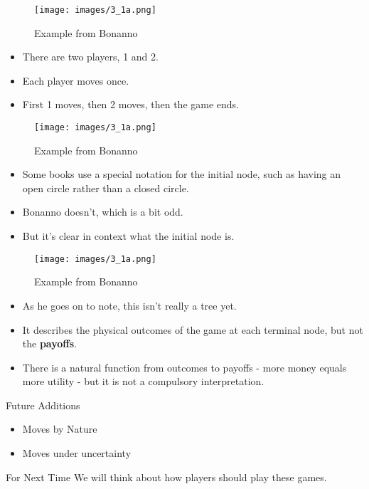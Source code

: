 \documentclass[
  ignorenonframetext,
]{beamer}
\providecommand{\tightlist}{%
  \setlength{\itemsep}{0pt}\setlength{\parskip}{0pt}}
\begin{document}
\begin{frame}
\begin{figure}
\centering
\texttt{[image: images/3\_1a.png]}
\caption{Example from Bonanno}
\end{figure}

\begin{itemize}
\tightlist
\item
  There are two players, 1 and 2.
\item
  Each player moves once.
\item
  First 1 moves, then 2 moves, then the game ends.
\end{itemize}
\end{frame}

\begin{frame}
\begin{figure}
\centering
\texttt{[image: images/3\_1a.png]}
\caption{Example from Bonanno}
\end{figure}

\begin{itemize}
\tightlist
\item
  Some books use a special notation for the initial node, such as having
  an open circle rather than a closed circle.
\item
  Bonanno doesn't, which is a bit odd.
\item
  But it's clear in context what the initial node is.
\end{itemize}
\end{frame}

\begin{frame}
\begin{figure}
\centering
\texttt{[image: images/3\_1a.png]}
\caption{Example from Bonanno}
\end{figure}

\begin{itemize}
\tightlist
\item
  As he goes on to note, this isn't really a tree yet.
\item
  It describes the physical outcomes of the game at each terminal node,
  but not the \textbf{payoffs}.
\item
  There is a natural function from outcomes to payoffs - more money
  equals more utility - but it is not a compulsory interpretation.
\end{itemize}
\end{frame}

\begin{frame}{Future Additions}
\protect\hypertarget{future-additions}{}
\begin{itemize}[<+->]
\tightlist
\item
  Moves by Nature
\item
  Moves under uncertainty
\end{itemize}
\end{frame}

\begin{frame}{For Next Time}
\protect\hypertarget{for-next-time}{}
We will think about how players should play these games.
\end{frame}
\end{document}
